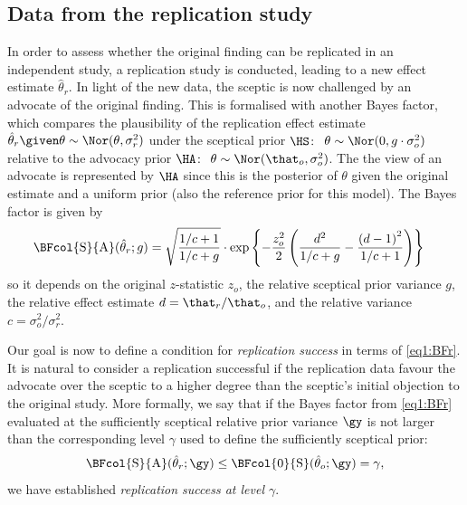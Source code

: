 \subsection{Data from the replication study}
\label{sec1:bfr}
In order to assess whether the original finding can be replicated in an
independent study, a replication study is conducted, leading to a new effect
estimate $\hat{\theta}_r$. In light of the new data, the sceptic is now
challenged by an advocate of the original finding. This is formalised with
another Bayes factor, which compares the plausibility of the replication effect
estimate $\hat{\theta}_r \given \theta \sim \Nor(\theta, \sigma^2_r)$ under the
sceptical prior $\HS \colon$ $\theta \sim \Nor(0, g \cdot \sigma^2_o)$ relative
to the advocacy prior $\HA \colon$ $\theta \sim \Nor(\that_o, \sigma^2_o)$. The
the view of an advocate is represented by $\HA$ since this is the posterior of
$\theta$ given the original estimate and a uniform prior (also the reference
prior for this model). The Bayes factor is given by
\begin{align}
  \label{eq1:BFr}
  \BFcol{\mathrm{S}}{\mathrm{A}}(\hat{\theta}_r; g)
  &= \sqrt{\frac{1/c + 1}{1/c + g}} \cdot
  \exp\left\{-\frac{z_o^2}{2}\left(\frac{d^2}{1/c + g} -
  \frac{\left(d - 1\right)^2}{1/c + 1} \right)\right\}
\end{align}
so it depends on the original $z$-statistic $z_o$, the relative sceptical prior
variance $g$, the relative effect estimate $d = \that_r/\that_o$, and the
relative variance $c = \sigma^2_o/\sigma^2_r$.

Our goal is now to define a condition for \emph{replication success} in terms of
\eqref{eq1:BFr}. It is natural to consider a replication successful if the
replication data favour the advocate over the sceptic to a higher degree than
the sceptic's initial objection to the original study. More formally, we say
that if the Bayes factor from \eqref{eq1:BFr} evaluated at the sufficiently
sceptical relative prior variance $\gy$ is not larger than the corresponding
level $\gamma$ used to define the sufficiently sceptical prior:
\begin{align}
  \label{eq1:success}
  \BFcol{\mathrm{S}}{\mathrm{A}}(\hat{\theta}_r; \gy)
  \leq \BFcol{0}{\mathrm{S}}(\hat{\theta}_o; \gy) =\gamma,
\end{align}
we have established \emph{replication success at level $\gamma$}.


